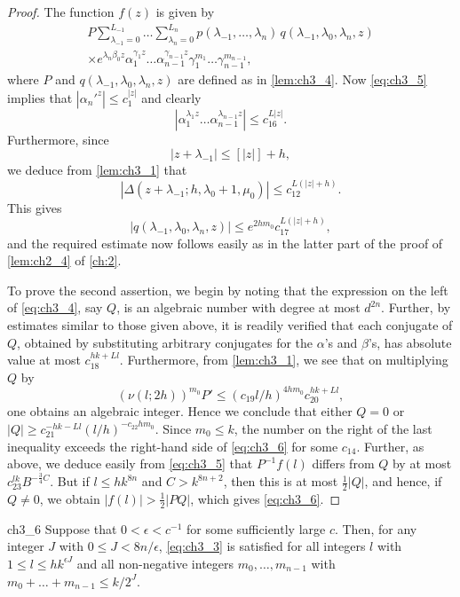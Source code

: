 \begin{proof}
The function $f(z)$ is given by
\begin{align*}
P \sum_{\lambda_{-1}=0}^{L_{-1}} \dots \sum_{\lambda_n=0}^{L_n} p(\lambda_{-1}, \dots, \lambda_n) \, q(\lambda_{-1}, \lambda_0, \lambda_n, z) \\
\times e^{\lambda_n \beta_0 z} \alpha_1^{\gamma_1 z} \dots \alpha_{n-1}^{\gamma_{n-1} z} \gamma_1^{m_1} \dots \gamma_{n-1}^{m_{n-1}},
\end{align*}
where $P$ and $q(\lambda_{-1}, \lambda_0, \lambda_n, z)$ are defined as in \autoref{lem:ch3_4}. Now \eqref{eq:ch3_5} implies that $|\alpha_n'^z| \le c_1^{|z|}$ and clearly
\[
\left|\alpha_1^{\lambda_1 z} \dots \alpha_{n-1}^{\lambda_{n-1} z}\right| \le c_{16}^{L|z|}.
\]
Furthermore, since
\[
|z+\lambda_{-1}| \le [|z|]+h,
\]
we deduce from \autoref{lem:ch3_1} that
\[
|\Delta(z+\lambda_{-1}; h, \lambda_0+1, \mu_0)| \le c_{12}^{L(|z|+h)}.
\]
This gives
\[
|q(\lambda_{-1}, \lambda_0, \lambda_n, z)| \le e^{2hm_0} c_{17}^{L(|z|+h)},
\]
and the required estimate now follows easily as in the latter part of the proof of \autoref{lem:ch2_4} of \autoref{ch:2}.

To prove the second assertion, we begin by noting that the expression on the left of \eqref{eq:ch3_4}, say $Q$, is an algebraic number with degree at most $d^{2n}$. Further, by estimates similar to those given above, it is readily verified that each conjugate of $Q$, obtained by substituting arbitrary conjugates for the $\alpha$'s and $\beta$'s, has absolute value at most $c_{18}^{hk+Ll}$. Furthermore, from \autoref{lem:ch3_1}, we see that on multiplying $Q$ by
\[
(\nu(l;2h))^{m_0} P' \le (c_{19} l/h)^{4hm_0} c_{20}^{hk+Ll},
\]
one obtains an algebraic integer. Hence we conclude that either $Q=0$ or $|Q| \ge c_{21}^{-hk-Ll} (l/h)^{-c_{22}hm_0}$.
Since $m_0 \le k$, the number on the right of the last inequality exceeds the right-hand side of \eqref{eq:ch3_6} for some $c_{14}$. Further, as above, we deduce easily from \eqref{eq:ch3_5} that $P^{-1} f(l)$ differs from $Q$ by at most $c_{23}^{lk} B^{-\frac{3}{4}C}$. But if $l \le hk^{8n}$ and $C > k^{8n+2}$, then this is at most $\frac{1}{2}|Q|$, and hence, if $Q \neq 0$, we obtain $|f(l)| > \frac{1}{2}|PQ|$, which gives \eqref{eq:ch3_6}.
\end{proof}

\begin{mylemma}{}{ch3_6}
Suppose that $0 < \epsilon < c^{-1}$ for some sufficiently large $c$. Then, for any integer $J$ with $0 \le J < 8n/\epsilon$, \eqref{eq:ch3_3} is satisfied for all integers $l$ with $1 \le l \le h k^{\epsilon J}$ and all non-negative integers $m_0, \dots, m_{n-1}$ with $m_0 + \dots + m_{n-1} \le k/2^J$.
\end{mylemma}

